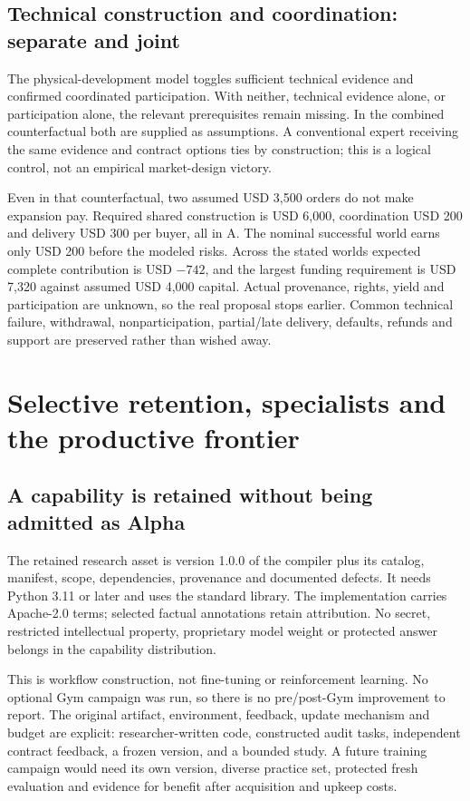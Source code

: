 \documentclass[11pt]{article}
\begin{document}
\subsection{Technical construction and coordination: separate and joint}
The physical-development model toggles sufficient technical evidence and confirmed coordinated participation. With neither, technical evidence alone, or participation alone, the relevant prerequisites remain missing. In the combined counterfactual both are supplied as assumptions. A conventional expert receiving the same evidence and contract options ties by construction; this is a logical control, not an empirical market-design victory.

Even in that counterfactual, two assumed USD 3,500 orders do not make expansion pay. Required shared construction is USD 6,000, coordination USD 200 and delivery USD 300 per buyer, all in A. The nominal successful world earns only USD 200 before the modeled risks. Across the stated worlds expected complete contribution is USD $-742$, and the largest funding requirement is USD 7,320 against assumed USD 4,000 capital. Actual provenance, rights, yield and participation are unknown, so the real proposal stops earlier. Common technical failure, withdrawal, nonparticipation, partial/late delivery, defaults, refunds and support are preserved rather than wished away.

\section{Selective retention, specialists and the productive frontier}
\subsection{A capability is retained without being admitted as Alpha}
The retained research asset is version 1.0.0 of the compiler plus its catalog, manifest, scope, dependencies, provenance and documented defects. It needs Python 3.11 or later and uses the standard library. The implementation carries Apache-2.0 terms; selected factual annotations retain attribution. No secret, restricted intellectual property, proprietary model weight or protected answer belongs in the capability distribution.

This is workflow construction, not fine-tuning or reinforcement learning. No optional Gym campaign was run, so there is no pre/post-Gym improvement to report. The original artifact, environment, feedback, update mechanism and budget are explicit: researcher-written code, constructed audit tasks, independent contract feedback, a frozen version, and a bounded study. A future training campaign would need its own version, diverse practice set, protected fresh evaluation and evidence for benefit after acquisition and upkeep costs.
\end{document}
